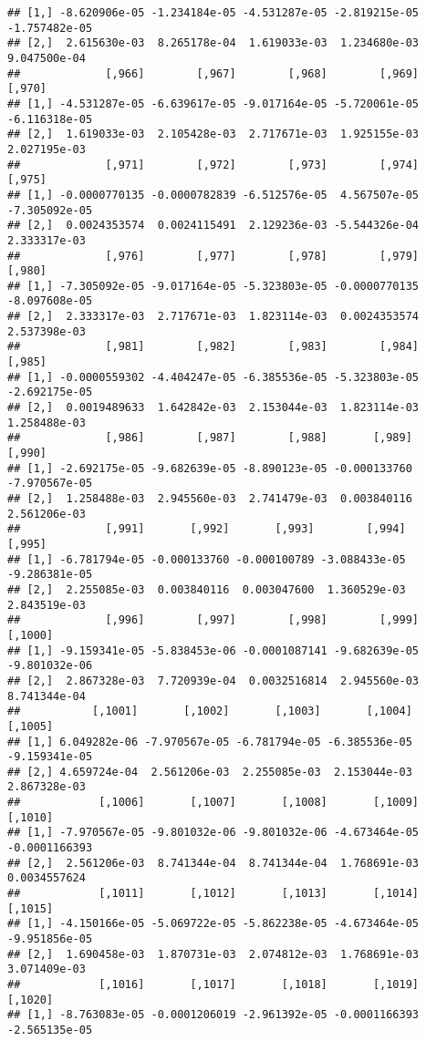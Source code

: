 \documentclass[
]{article}
\begin{document}
\begin{verbatim}
## [1,] -8.620906e-05 -1.234184e-05 -4.531287e-05 -2.819215e-05 -1.757482e-05
## [2,]  2.615630e-03  8.265178e-04  1.619033e-03  1.234680e-03  9.047500e-04
##             [,966]        [,967]        [,968]        [,969]        [,970]
## [1,] -4.531287e-05 -6.639617e-05 -9.017164e-05 -5.720061e-05 -6.116318e-05
## [2,]  1.619033e-03  2.105428e-03  2.717671e-03  1.925155e-03  2.027195e-03
##             [,971]        [,972]        [,973]        [,974]        [,975]
## [1,] -0.0000770135 -0.0000782839 -6.512576e-05  4.567507e-05 -7.305092e-05
## [2,]  0.0024353574  0.0024115491  2.129236e-03 -5.544326e-04  2.333317e-03
##             [,976]        [,977]        [,978]        [,979]        [,980]
## [1,] -7.305092e-05 -9.017164e-05 -5.323803e-05 -0.0000770135 -8.097608e-05
## [2,]  2.333317e-03  2.717671e-03  1.823114e-03  0.0024353574  2.537398e-03
##             [,981]        [,982]        [,983]        [,984]        [,985]
## [1,] -0.0000559302 -4.404247e-05 -6.385536e-05 -5.323803e-05 -2.692175e-05
## [2,]  0.0019489633  1.642842e-03  2.153044e-03  1.823114e-03  1.258488e-03
##             [,986]        [,987]        [,988]       [,989]        [,990]
## [1,] -2.692175e-05 -9.682639e-05 -8.890123e-05 -0.000133760 -7.970567e-05
## [2,]  1.258488e-03  2.945560e-03  2.741479e-03  0.003840116  2.561206e-03
##             [,991]       [,992]       [,993]        [,994]        [,995]
## [1,] -6.781794e-05 -0.000133760 -0.000100789 -3.088433e-05 -9.286381e-05
## [2,]  2.255085e-03  0.003840116  0.003047600  1.360529e-03  2.843519e-03
##             [,996]        [,997]        [,998]        [,999]       [,1000]
## [1,] -9.159341e-05 -5.838453e-06 -0.0001087141 -9.682639e-05 -9.801032e-06
## [2,]  2.867328e-03  7.720939e-04  0.0032516814  2.945560e-03  8.741344e-04
##           [,1001]       [,1002]       [,1003]       [,1004]       [,1005]
## [1,] 6.049282e-06 -7.970567e-05 -6.781794e-05 -6.385536e-05 -9.159341e-05
## [2,] 4.659724e-04  2.561206e-03  2.255085e-03  2.153044e-03  2.867328e-03
##            [,1006]       [,1007]       [,1008]       [,1009]       [,1010]
## [1,] -7.970567e-05 -9.801032e-06 -9.801032e-06 -4.673464e-05 -0.0001166393
## [2,]  2.561206e-03  8.741344e-04  8.741344e-04  1.768691e-03  0.0034557624
##            [,1011]       [,1012]       [,1013]       [,1014]       [,1015]
## [1,] -4.150166e-05 -5.069722e-05 -5.862238e-05 -4.673464e-05 -9.951856e-05
## [2,]  1.690458e-03  1.870731e-03  2.074812e-03  1.768691e-03  3.071409e-03
##            [,1016]       [,1017]       [,1018]       [,1019]       [,1020]
## [1,] -8.763083e-05 -0.0001206019 -2.961392e-05 -0.0001166393 -2.565135e-05

\end{verbatim}
\end{document}
